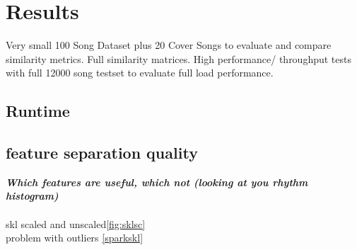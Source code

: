 
\chapter{Results}\label{bds2}

Very small 100 Song Dataset plus 20 Cover Songs to evaluate and compare similarity metrics. Full similarity matrices. 
High performance/ throughput tests with full 12000 song testset to evaluate full load performance.\\

\section{Runtime}

\section{feature separation quality}\label{featqual}

\textit{\textbf{Which features are useful, which not (looking at you rhythm histogram)\\}}
\\

\noindent skl scaled and unscaled\ref{fig:sklsc}\\
problem with outliers \ref{sparkskl}

